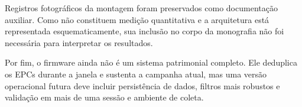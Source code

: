 Registros fotográficos da montagem foram preservados como documentação auxiliar. Como não constituem medição quantitativa e a arquitetura está representada esquematicamente, sua inclusão no corpo da monografia não foi necessária para interpretar os resultados.

Por fim, o firmware ainda não é um sistema patrimonial completo. Ele deduplica os EPCs durante a janela e sustenta a campanha atual, mas uma versão operacional futura deve incluir persistência de dados, filtros mais robustos e validação em mais de uma sessão e ambiente de coleta.
